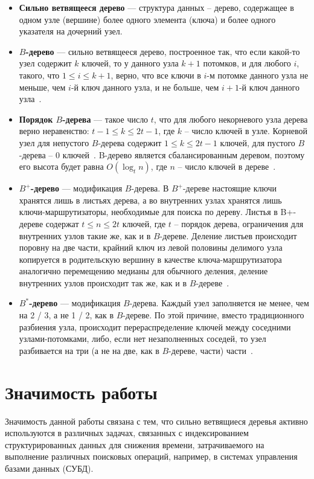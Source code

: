 \documentclass{llncs}
\begin{document}
	\begin{itemize}
		\item \textbf{Сильно ветвящееся дерево} --- структура данных – дерево, содержащее в одном узле (вершине) более одного элемента (ключа) и более одного указателя на дочерний узел.
		\item \textbf{$B$-дерево} --- сильно ветвящееся дерево, построенное так, что если какой-то узел содержит $k$ ключей, то у данного узла $k+1$ потомков, и для любого $i$, такого, что $1\leq i\leq k+1$, верно, что все ключи в $i$-м потомке данного узла не меньше, чем $i$-й ключ данного узла, и не больше, чем $i+1$-й ключ данного узла~\cite{Kormen}.
		\item \textbf{Порядок $B$-дерева} --- такое число $t$, что для любого некорневого узла дерева верно неравенство: $t-1\leq k\leq 2t-1$, где $k$ – число ключей в узле. Корневой узел для непустого $B$-дерева содержит $1\leq k\leq 2t-1$ ключей, для пустого $B$-дерева – 0 ключей~\cite{Kormen}. B-дерево является сбалансированным деревом, поэтому его высота будет равна $O(\log_t n)$, где $n$ – число ключей в дереве~\cite{Kormen}.
		\item \textbf{$B^+$-дерево} --- модификация $B$-дерева. В $B^+$-дереве настоящие ключи хранятся лишь в листьях дерева, а во внутренних узлах хранятся лишь ключи-маршрутизаторы, необходимые для поиска по дереву. Листья в B+-дереве содержат $t\leq n\leq 2t$ ключей, где $t$ – порядок дерева, ограничения для внутренних узлов такие же, как и в $B$-дереве. Деление листьев происходит поровну на две части, крайний ключ из левой половины делимого узла копируется в родительскую вершину в качестве ключа-маршрутизатора аналогично перемещению медианы для обычного деления, деление внутренних узлов происходит так же, как и в $B$-дереве~\cite{Kerttu}.
		\item \textbf{$B^*$-дерево} --- модификация $B$-дерева. Каждый узел заполняется не менее, чем на 2 / 3, а не 1 / 2, как в $B$-дереве. По этой причине, вместо традиционного разбиения узла, происходит перераспределение ключей между соседними узлами-потомками, либо, если нет незаполненных соседей, то узел разбивается на три (а не на две, как в $B$-дереве, части) части~\cite{Nist}.
	\end{itemize}
	
	\section{Значимость работы}
	
	Значимость данной работы связана с тем, что сильно ветвящиеся деревья активно используются в различных задачах, связанных с индексированием структурированных данных для снижения времени, затрачиваемого на выполнение различных поисковых операций, например, в системах управления базами данных (СУБД).
	
\end{document}
